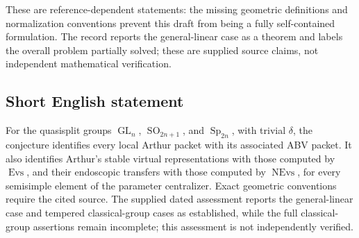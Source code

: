 \documentclass[11pt]{article}
\begin{document}
These are reference-dependent statements: the missing geometric definitions and normalization conventions prevent this draft from being a fully self-contained formulation. The record reports the general-linear case as a theorem and labels the overall problem partially solved; these are supplied source claims, not independent mathematical verification.
\subsection{Short English statement}
For the quasisplit groups \(\operatorname{GL}_n\), \(\operatorname{SO}_{2n+1}\), and \(\operatorname{Sp}_{2n}\), with trivial \(\delta\), the conjecture identifies every local Arthur packet with its associated ABV packet. It also identifies Arthur's stable virtual representations with those computed by \(\operatorname{Evs}\), and their endoscopic transfers with those computed by \(\operatorname{NEvs}\), for every semisimple element of the parameter centralizer. Exact geometric conventions require the cited source. The supplied dated assessment reports the general-linear case and tempered classical-group cases as established, while the full classical-group assertions remain incomplete; this assessment is not independently verified.
\end{document}
